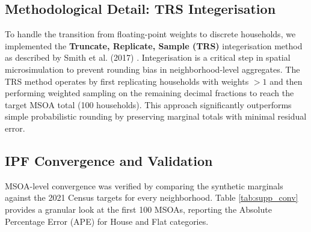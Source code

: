 \documentclass[11pt, a4paper]{article}
\begin{document}
\subsection{Methodological Detail: TRS Integerisation}

To handle the transition from floating-point weights to discrete 
households, we implemented the \textbf{Truncate, Replicate, Sample (TRS)} 
integerisation method as described by Smith et al. (2017) \cite{Smith2017}. 
Integerisation is a critical step in spatial microsimulation to prevent 
rounding bias in neighborhood-level aggregates. The TRS method operates by 
first replicating households with weights $>1$ and then performing weighted 
sampling on the remaining decimal fractions to reach the target MSOA total 
(100 households). This approach significantly outperforms simple 
probabilistic rounding by preserving marginal totals with minimal residual 
error.

\subsection{IPF Convergence and Validation}

MSOA-level convergence was verified by comparing the synthetic marginals 
against the 2021 Census targets for every neighborhood. Table \ref{tab:supp_conv} 
provides a granular look at the first 100 MSOAs, reporting the Absolute 
Percentage Error (APE) for House and Flat categories.
\end{document}
